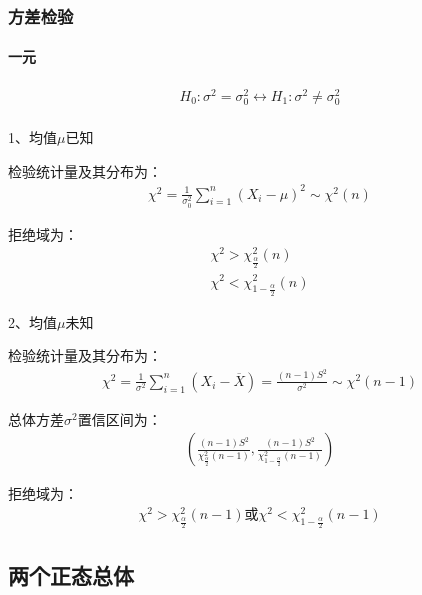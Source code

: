 \documentclass[12pt]{book}
\begin{document}
\subsubsection{方差检验}

\paragraph{一元}


\begin{gather*}
    H_0: \sigma^2=\sigma_0^2 \leftrightarrow H_1: \sigma^2\neq\sigma_0^2 \\
\end{gather*}


1、均值$\mu$已知

检验统计量及其分布为：
\begin{gather*}
    \chi^2=\frac{1}{\sigma_0^2}\sum_{i=1}^{n}{(X_i-\mu)^2}\sim \chi^2(n)
\end{gather*}


拒绝域为：
\begin{gather*}
    \chi^2>\chi_{\frac{\alpha}{2}}^{2}(n)\\
    \chi^2<\chi_{1-\frac{\alpha}{2}}^{2}(n)
\end{gather*}


2、均值$\mu$未知

检验统计量及其分布为：
\begin{gather*}
    \chi^2=\frac{1}{\sigma^2}\sum_{i=1}^{n}{ \left(X_i- \overline{X}\right) } =\frac{(n-1)S^2}{\sigma^2} \sim \chi^2(n-1)
\end{gather*}


总体方差$\sigma^2$置信区间为：
\begin{gather*}
    \left( \frac{(n-1)S^2}{\chi_{\frac{\alpha}{2}}^{2} (n-1)}, \frac{(n-1)S^2}{\chi_{1-\frac{\alpha}{2}}^{2} (n-1)} \right)
\end{gather*}


拒绝域为：
\begin{gather*}
    \chi^2>\chi_{\frac{\alpha}{2}}^2(n-1) 或 χ^2<χ_{1-\frac{\alpha}{2}}^2(n-1)
\end{gather*}













\subsection{两个正态总体}
\end{document}

